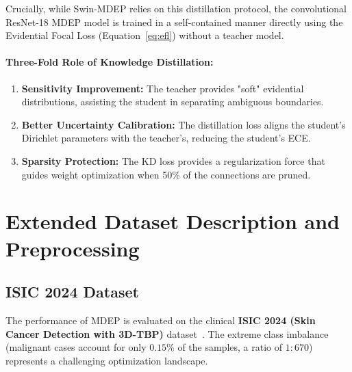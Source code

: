 \documentclass[letterpaper]{article} %
\begin{document}
Crucially, while Swin-MDEP relies on this distillation protocol, the convolutional ResNet-18 MDEP model is trained in a self-contained manner directly using the Evidential Focal Loss (Equation~\ref{eq:efl}) without a teacher model.

\paragraph{Three-Fold Role of Knowledge Distillation:}
\begin{enumerate}
    \item \textbf{Sensitivity Improvement:} The teacher provides "soft" evidential distributions, assisting the student in separating ambiguous boundaries.
    \item \textbf{Better Uncertainty Calibration:} The distillation loss aligns the student's Dirichlet parameters with the teacher's, reducing the student's ECE.
    \item \textbf{Sparsity Protection:} The KD loss provides a regularization force that guides weight optimization when 50\% of the connections are pruned.
\end{enumerate}


\section{Extended Dataset Description and Preprocessing}
\subsection{ISIC 2024 Dataset}\label{subsec:isic}

The performance of MDEP is evaluated on the clinical \textbf{ISIC 2024 (Skin Cancer Detection with 3D-TBP)} dataset~\cite{isic2024, codella2019skin, tschandl2018ham10000}. The extreme class imbalance (malignant cases account for only $0.15\%$ of the samples, a ratio of $1{:}670$) represents a challenging optimization landscape.
\end{document}
